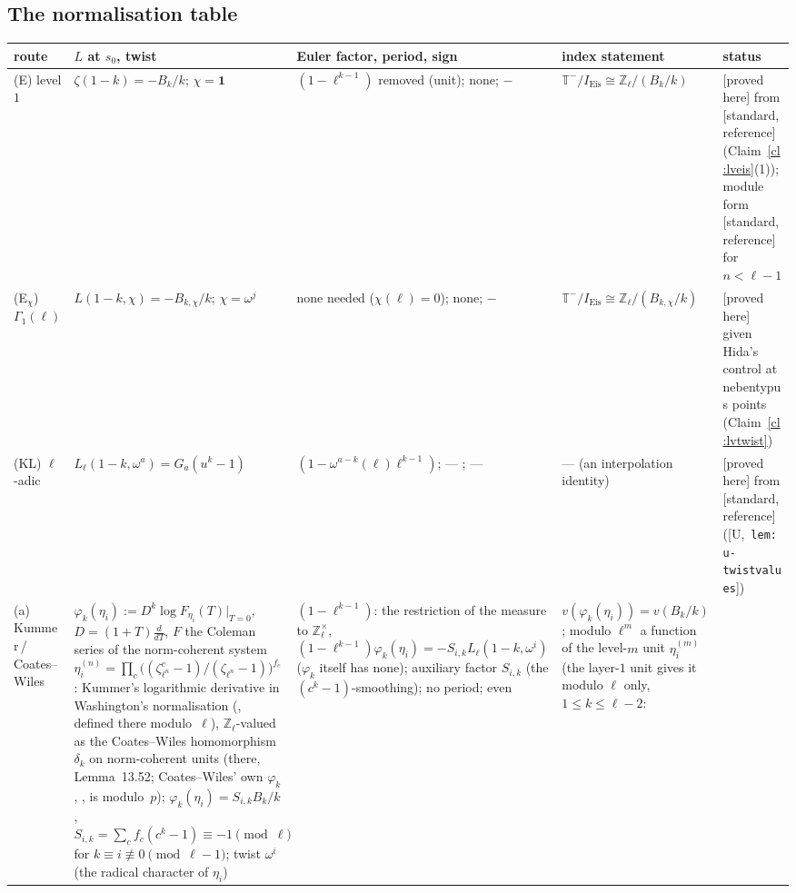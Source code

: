 \documentclass[11pt]{article}
\theoremstyle{remark}
\newcommand{\Z}{\mathbb{Z}}
\newcommand{\Ga}{\Gamma}
\newcommand{\T}{\mathbb{T}}
\newcommand{\PROVED}{\textsf{[proved here]}}
\newcommand{\STD}{\textsf{[standard, reference]}}
\newcommand{\Ucite}[1]{[U,~\texttt{#1}]}               %
\begin{document}
\subsection{The normalisation table}\label{sec:lvnorm}
\begin{center}\footnotesize
\begin{longtable}{@{}>{\raggedright\arraybackslash}p{2.2cm}>{\raggedright\arraybackslash}p{3.2cm}>{\raggedright\arraybackslash}p{3.3cm}>{\raggedright\arraybackslash}p{3.0cm}>{\raggedright\arraybackslash}p{3.6cm}@{}}
\toprule
route & $L$ at $s_0$, twist & Euler factor, period, sign & index statement & status \\
\midrule
\endhead
(E) level $1$ & $\zeta(1-k)=-B_k/k$; $\chi=\mathbf1$ & $(1-\ell^{k-1})$ removed (unit); none; $-$ & $\T^{-}/I_{\mathrm{Eis}}\cong\Z_\ell/(B_k/k)$ & \PROVED{} from \STD{} (Claim~\ref{cl:lveis}(1)); module form \STD{} for $n<\ell-1$ \\
(E$_\chi$) $\Ga_1(\ell)$ & $L(1-k,\chi)=-B_{k,\chi}/k$; $\chi=\omega^{j}$ & none needed ($\chi(\ell)=0$); none; $-$ & $\T^{-}/I_{\mathrm{Eis}}\cong\Z_\ell/(B_{k,\chi}/k)$ & \PROVED{} given Hida's control at nebentypus points (Claim~\ref{cl:lvtwist}) \\
(KL) $\ell$-adic & $L_\ell(1-k,\omega^{a})=G_a(u^{k}-1)$ & $(1-\omega^{a-k}(\ell)\ell^{k-1})$; --- ; --- & --- (an interpolation identity) & \PROVED{} from \STD{} (\Ucite{lem:u-twistvalues}) \\
(a) Kummer\,/\,Coates--Wiles & $\varphi_k(\eta_i):=D^{k}\log F_{\eta_i}(T)|_{T=0}$, $D=(1+T)\tfrac{d}{dT}$, $F$ the Coleman series of the norm-coherent system
  $\eta_i^{(n)}=\prod_c\bigl((\zeta_{\ell^n}^{c}-1)/(\zeta_{\ell^n}-1)\bigr)^{f_c}$: Kummer's logarithmic derivative in Washington's normalisation
  (\cite[\S13.7, pp.~299--300]{washington1st}, defined there modulo~$\ell$), $\Z_\ell$-valued as the Coates--Wiles homomorphism $\delta_k$ on norm-coherent units (there,
  Lemma~13.52; Coates--Wiles' own $\varphi_k$, \cite[p.~230, (8)]{coates_wiles}, is modulo~$p$); $\varphi_k(\eta_i)=S_{i,k}B_k/k$, $S_{i,k}=\sum_cf_c(c^{k}-1)\equiv-1\pmod\ell$
  for $k\equiv i\not\equiv0\pmod{\ell-1}$; twist $\omega^{i}$ (the radical character of $\eta_i$)
  & $(1-\ell^{k-1})$: the restriction of the measure to $\Z_\ell^{\times}$, $(1-\ell^{k-1})\varphi_k(\eta_i)=-S_{i,k}L_\ell(1-k,\omega^{i})$ ($\varphi_k$ itself has none);
  auxiliary factor $S_{i,k}$ (the $(c^{k}-1)$-smoothing); no period; even
  & $v(\varphi_k(\eta_i))=v(B_k/k)$; modulo $\ell^{m}$ a function of the level-$m$ unit $\eta_i^{(m)}$ (the layer-$1$ unit gives it modulo $\ell$ only, $1\le k\le\ell-2$:

\end{longtable}
\end{center}
\end{document}
